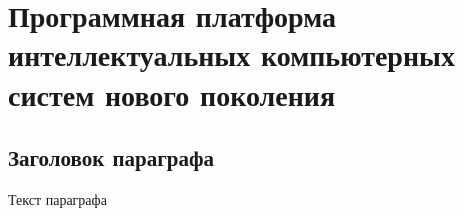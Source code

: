 
\chapter{Программная платформа интеллектуальных компьютерных систем нового поколения}
\label{chapter_soft_platform}


\section{Заголовок параграфа}
Текст параграфа

%